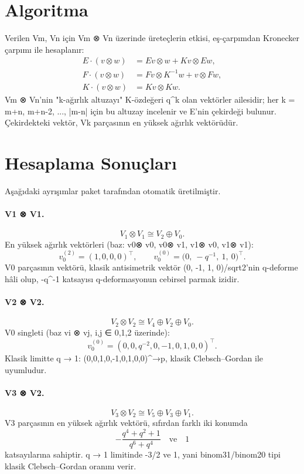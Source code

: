 \documentclass[12pt,a4paper]{report}
\numberwithin{equation}{chapter}
\theoremstyle{plain}
\theoremstyle{definition}
\begin{document}
\section{Algoritma}

Verilen Vm, Vn için Vm ⊗ Vn üzerinde üreteçlerin etkisi,
eş-çarpımdan Kronecker çarpımı ile hesaplanır:
\begin{align*}
  E \cdot (v \otimes w) &= E v \otimes w + K v \otimes E w, \\
  F \cdot (v \otimes w) &= F v \otimes K^{-1} w + v \otimes F w, \\
  K \cdot (v \otimes w) &= K v \otimes K w.
\end{align*}
Vm ⊗ Vn'nin "k-ağırlık altuzayı" K-özdeğeri q^k olan
vektörler ailesidir; her k = m+n, m+n-2, ..., |m-n| için bu altuzay
incelenir ve E'nin çekirdeği bulunur. Çekirdekteki vektör, Vk
parçasının en yüksek ağırlık vektörüdür.

\section{Hesaplama Sonuçları}

Aşağıdaki ayrışımlar paket tarafından otomatik üretilmiştir.

\paragraph{V1 ⊗ V1.}
\[
  V_1 \otimes V_1 \cong V_2 \oplus V_0.
\]
En yüksek ağırlık vektörleri (baz: v0⊗ v0, v0⊗ v1, v1⊗ v0, v1⊗ v1):
\[
  v_0^{(2)} = (1, 0, 0, 0)^\top, \qquad
  v_0^{(0)} = \big(0,\ -q^{-1},\ 1,\ 0\big)^\top.
\]
V0 parçasının vektörü, klasik antisimetrik vektör
(0, -1, 1, 0)/sqrt2'nin q-deforme hâli olup, -q^-1 katsayısı
q-deformasyonun cebirsel parmak izidir.

\paragraph{V2 ⊗ V2.}
\[
  V_2 \otimes V_2 \cong V_4 \oplus V_2 \oplus V_0.
\]
V0 singleti (baz vi ⊗ vj, i,j ∈ 0,1,2 üzerinde):
\[
  v_0^{(0)} = (0, 0, q^{-2}, 0, -1, 0, 1, 0, 0)^\top.
\]
Klasik limitte q → 1: (0,0,1,0,-1,0,1,0,0)^→p, klasik
Clebsch--Gordan ile uyumludur.

\paragraph{V3 ⊗ V2.}
\[
  V_3 \otimes V_2 \cong V_5 \oplus V_3 \oplus V_1.
\]
V3 parçasının en yüksek ağırlık vektörü, sıfırdan farklı iki konumda
\[
  -\frac{q^4 + q^2 + 1}{q^6 + q^4} \quad\text{ve}\quad 1
\]
katsayılarına sahiptir. q → 1 limitinde -3/2 ve 1, yani
binom31/binom20 tipi klasik Clebsch--Gordan oranını verir.
\end{document}
